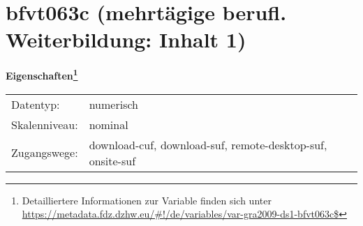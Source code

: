 
    \setcounter{footnote}{0}

    \vspace*{-1.8cm}
	\section{bfvt063c (mehrtägige berufl. Weiterbildung: Inhalt 1)}
	\label{section:bfvt063c}



    \vspace*{0.5cm}
    \noindent\textbf{Eigenschaften\footnote{Detailliertere Informationen zur Variable finden sich unter
		\url{https://metadata.fdz.dzhw.eu/\#!/de/variables/var-gra2009-ds1-bfvt063c$}}}\\
	\begin{tabularx}{\hsize}{@{}lX}
	Datentyp: & numerisch \\
	Skalenniveau: & nominal \\
	Zugangswege: &
	  download-cuf, 
	  download-suf, 
	  remote-desktop-suf, 
	  onsite-suf
 \\
    \end{tabularx}



